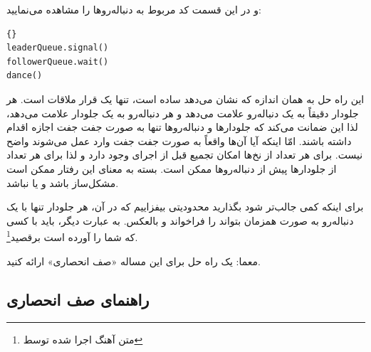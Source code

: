 \documentclass{book}
\newcommand{\clearemptydoublepage}{\newpage\cleardoublepage}
\begin{document}
    و در این قسمت کد مربوط به دنباله‌روها را مشاهده می‌نمایید:

\begin{latin}
\begin{latin}
\begin{lstlisting}[title=\rl{راه حل صف (دنباله‌روها)}]{}
leaderQueue.signal()
followerQueue.wait()
dance()
\end{lstlisting}
\end{latin}
\end{latin}

    این راه حل به همان اندازه که نشان می‌دهد ساده‌ است، تنها یک قرار ملاقات است. 
    هر جلودار دقیقاً به یک دنباله‌رو علامت می‌دهد و هر دنباله‌رو به یک جلودار علامت می‌دهد، لذا این ضمانت می‌کند که جلو‌دارها و دنباله‌روها تنها 
    به صورت جفت جفت اجازه اقدام داشته باشند.  امّا اینکه آیا آ‌ن‌ها واقعاً به صورت جفت جفت وارد عمل می‌شوند واضح نیست. 
    برای هر تعداد از نخ‌ها امکان تجمیع قبل از اجرای  وجود دارد و لذا برای هر تعداد از جلودارها 
    پیش از دنباله‌روها ممکن است. 
    بسته به معنای  این رفتار ممکن است مشکل‌ساز باشد و یا نباشد. 

    برای اینکه کمی جالب‌تر شود بگذارید محدودیتی بیفزاییم که در آن، هر جلودار تنها با یک دنباله‌رو به صورت همزمان بتواند  را 
    فراخواند و بالعکس. به عبارت دیگر، باید با کسی که شما را آورده است برقصید\footnote{متن آهنگ اجرا شده توسط }. 

    معما: یک راه حل برای این مساله «صف انحصاری» ارائه کنید.

\clearemptydoublepage
\subsection {راهنمای صف انحصاری}
\end{document}
